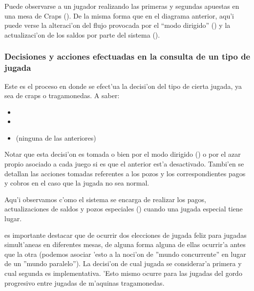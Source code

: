 
Puede observarse a un jugador realizando las primeras y segundas apuestas en una mesa de Craps ().
De la misma forma que en el diagrama anterior, aqu'i puede verse la alteraci'on del flujo provocada por el ``modo dirigido'' () y la actualizaci'on de los saldos por parte del sistema ().

\clearpage





\subsubsection{Decisiones y acciones efectuadas en la consulta de un tipo de jugada}
Este es el proceso en donde se efect'ua la decisi'on del tipo de cierta jugada, ya sea de craps o tragamonedas. A saber:

\begin{itemize}
  \item {}
  \item {} 
  \item {} (ninguna de las anteriores)
\end{itemize}

Notar que esta decisi'on es tomada o bien por el modo dirigido () o por el azar propio asociado a cada juego si es que el anterior est'a desactivado. Tambi'en se detallan las acciones tomadas referentes a los pozos y los correspondientes pagos y cobros en el caso que la jugada no sea normal.


Aqu'i observamos c'omo el sistema se encarga de realizar los pagos, actualizaciones de saldos y pozos especiales () cuando una jugada especial tiene lugar.

 es importante destacar que de ocurrir dos elecciones de jugada feliz para jugadas simult'aneas en diferentes mesas, de alguna forma alguna de ellas ocurrir'a antes que la otra (podemos asociar 'esto a la noci'on de ''mundo concurrente'' en lugar de un ''mundo paralelo''). La decisi'on de cual jugada se considerar'a primera y cual segunda es implementativa. 'Esto mismo ocurre para las jugadas del gordo progresivo entre jugadas de m'aquinas tragamonedas.

